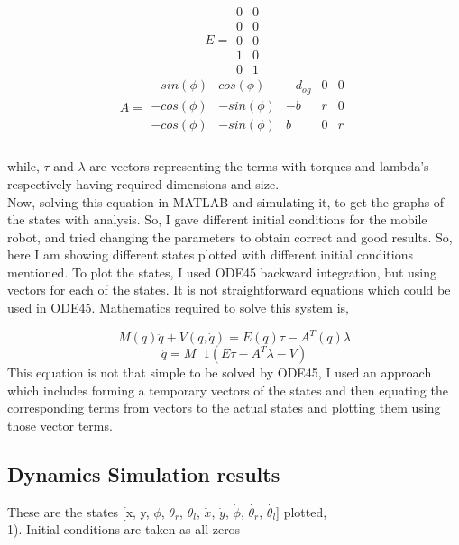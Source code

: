 \documentclass[12pt]{article}
\begin{document}
\begin{equation*}
E=
\begin{matrix}
 0&0\\0&0\\0&0\\1&0\\0&1
\end{matrix}
\end{equation*}
\begin{equation*}
A=
\begin{matrix}
-sin(\phi) & cos(\phi) & -d_{og} & 0 & 0\\
-cos(\phi) & -sin(\phi)& -b & r & 0\\
-cos(\phi) & -sin(\phi)& b & 0 & r\\
\end{matrix}
\end{equation*}
\\
while, $\tau$ and $\lambda$ are vectors representing the terms with torques and lambda's respectively having required dimensions and size.
\\
Now, solving this equation in MATLAB and simulating it, to get the graphs of the states with analysis. So, I gave different initial conditions for the mobile robot, and tried changing the parameters to obtain correct and good results. So, here I am showing different states plotted with different initial conditions mentioned. To plot the states, I used ODE45 backward integration, but using vectors for each of the states. It is not straightforward equations which could be used in ODE45. Mathematics required to solve this system is,

\[M(q)\ddot{q}+V(q,\dot{q})=E(q)\tau-A^T(q)\lambda\]
\[\ddot{q}=M^-1(E\tau-A^{T}\lambda-V)\]
This equation is not that simple to be solved by ODE45, I used an approach which includes forming a temporary vectors of the states and then equating the corresponding terms from vectors to the actual states and plotting them using those vector terms.
\\
\subsection{Dynamics Simulation results}
These are the states [x, y, $\phi$, $\theta_r$, $\theta_l$, $\dot{x}$, $\dot{y}$, $\dot{\phi}$, $\dot{\theta_r}$, $\dot{\theta_l}$] plotted,\\
1). Initial conditions are taken as all zeros
\end{document}
